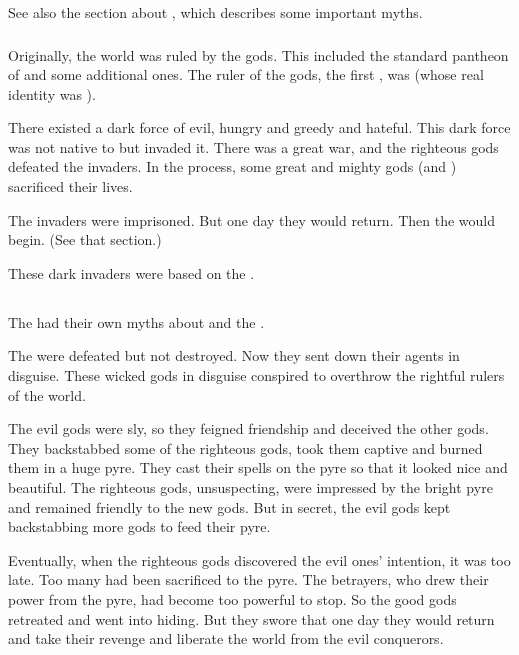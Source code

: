 See also the section about , which describes some important myths. 





\subsubsection{\Banes}
Originally, the world was ruled by the \Ortaican gods.
This included the standard pantheon of \Taorthae and some additional ones. 
The ruler of the gods, the first \Nechsain, was  (whose real identity was \Sethicus). 

There existed a dark force of evil, hungry and greedy and hateful. 
This dark force was not native to \Miith but invaded it. 
There was a great war, and the righteous gods defeated the invaders. 
In the process, some great and mighty gods (\Settras and \Tiamat) sacrificed their lives.

The invaders were imprisoned. 
But one day they would return. 
Then the  would begin. 
(See that section.) 

These dark invaders were based on the \banes. 






\subsection{\Iquin}
The \Ortaicans had their own myths about \Iquin and the \sephiroth.

The  were defeated but not destroyed. 
Now they sent down their agents in disguise. 
These wicked gods in disguise conspired to overthrow the rightful rulers of the world. 

The evil gods were sly, so they feigned friendship and deceived the other gods. 
They backstabbed some of the righteous gods, took them captive and burned them in a huge pyre. 
They cast their spells on the pyre so that it looked nice and beautiful. 
The righteous gods, unsuspecting, were impressed by the bright pyre and remained friendly to the new gods. 
But in secret, the evil gods kept backstabbing more gods to feed their pyre. 

Eventually, when the righteous gods discovered the evil ones' intention, it was too late. 
Too many had been sacrificed to the pyre.
The betrayers, who drew their power from the pyre, had become too powerful to stop.
So the good gods retreated and went into hiding.
But they swore that one day they would return and take their revenge and liberate the world from the evil conquerors. 


